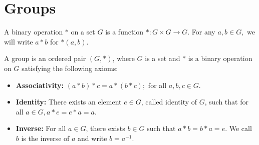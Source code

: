 \section{Groups}
\begin{definition}
    A binary operation $*$ on a set $G$ is a function $*:G \times G \longrightarrow G$. For any $a, b \in G,$ we will write $a * b$ for $*(a, b)$.
\end{definition}
\begin{definition}[Group]
    A group is an ordered pair $(G,*)$, where $G$ is a set and $*$ is a binary operation on $G$ satisfying the following axioms:
    \begin{itemize}
        \item \textbf{Associativity:} $(a * b) * c = a * (b * c);$ for all $a, b, c \in G.$
        \item \textbf{Identity:} There exists an element $e \in G$, called identity of $G$, such that for all $a \in G, a * e = e * a = a.$
        \item \textbf{Inverse:} For all $a \in G$, there exists $b\in G$ such that $a * b = b * a = e.$ We call $b$ is the inverse of $a$ and write $b = a^{-1}.$ 
    \end{itemize}
\end{definition}

